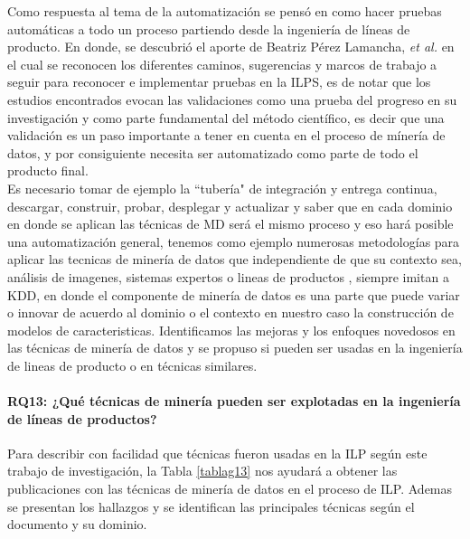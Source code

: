 Como respuesta al tema de la automatización se pensó en como hacer pruebas automáticas a todo un proceso partiendo desde la ingeniería de líneas de producto. En donde, se descubrió el aporte de Beatriz Pérez Lamancha, \textit{et al.} en el cual se reconocen los diferentes caminos, sugerencias y marcos de trabajo a seguir para reconocer e implementar pruebas en la ILPS, es de notar que los estudios encontrados evocan las validaciones como una prueba del progreso en su investigación y como parte fundamental del método científico, es decir que una validación es un paso importante a tener en cuenta en el proceso de mínería de datos\cite{Liao2008}, y por consiguiente necesita ser automatizado como parte de todo el producto final. \\
Es necesario tomar de ejemplo la ``tubería" de integración y entrega continua, descargar, construir, probar, desplegar y actualizar y saber que en cada dominio en donde se aplican las técnicas de MD será el mismo proceso y eso hará posible una automatización general, tenemos como ejemplo numerosas metodologías para aplicar las tecnicas de minería de datos que independiente de que su contexto sea, análisis de imagenes\cite{Bouguila2010},  sistemas expertos\cite{Felfernig2015} o lineas de productos \cite{Benavides2010}, siempre imitan a KDD, en donde el componente de minería de datos es una parte que puede variar o innovar de acuerdo al dominio o el contexto en nuestro caso la construcción de modelos de caracteristicas.
Identificamos las mejoras y los enfoques novedosos en las técnicas de minería de datos y se propuso si pueden ser usadas en la ingeniería de lineas de producto o en técnicas similares\cite{Eleuterio2015}. 
\paragraph{RQ13: ¿Qué técnicas de minería pueden ser explotadas en la ingeniería de líneas de productos?}  

Para describir con facilidad que técnicas fueron usadas en la ILP según este trabajo de investigación, la Tabla \ref{tablag13} nos ayudará a obtener las publicaciones con las técnicas de minería de datos en el proceso de ILP. Ademas se presentan los hallazgos y se identifican las principales técnicas según el documento y su dominio.

